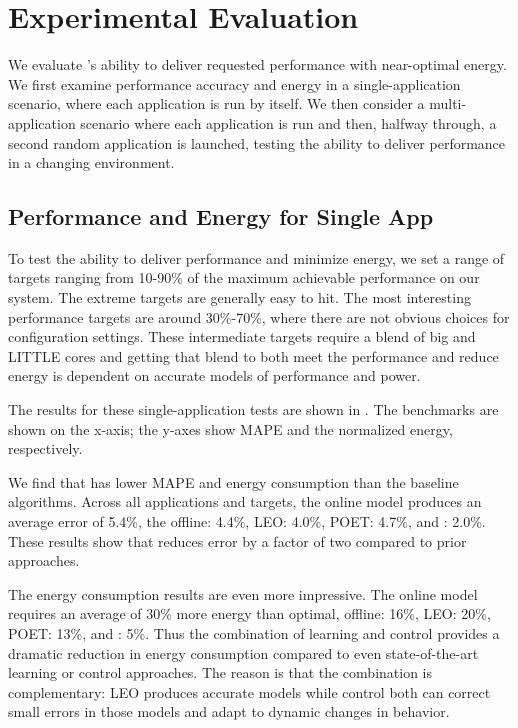\section{Experimental Evaluation}
We evaluate \SYSTEM{}'s ability to deliver requested performance with
near-optimal energy.  We first examine performance accuracy and energy
in a single-application scenario, where each application is run by
itself.  We then consider a multi-application scenario where each
application is run and then, halfway through, a second random
application is launched, testing the ability to deliver performance in
a changing environment.  

\subsection{Performance and Energy for Single App}
To test the ability to deliver performance and minimize energy, we set
a range of targets ranging from 10-90\% of the maximum achievable
performance on our system. The extreme targets are generally easy to
hit. The most interesting performance targets are around 30\%-70\%,
where there are not obvious choices for configuration settings. These
intermediate targets require a blend of big and LITTLE cores and
getting that blend to both meet the performance and reduce energy is
dependent on accurate models of performance and power.

The results for these single-application tests are shown in
.  The benchmarks are shown on the
x-axis; the y-axes show MAPE and the normalized energy, respectively.

We find that \SYSTEM{} has lower MAPE and energy consumption than the
baseline algorithms. Across all applications and targets, the online
model produces an average error of 5.4\%, the offline: 4.4\%, LEO:
4.0\%, POET: 4.7\%, and \SYSTEM{}: 2.0\%.  These results show that
\SYSTEM{} reduces error by a factor of two compared to prior
approaches.  

The energy consumption results are even more impressive.  The online
model requires an average of 30\% more energy than optimal, offline: 16\%, LEO: 20\%, POET: 13\%, and \SYSTEM{}: 5\%.  Thus the combination
of learning and control provides a dramatic reduction in energy
consumption compared to even state-of-the-art learning or control
approaches.  The reason is that the combination is complementary: LEO
produces accurate models while control both can correct small errors
in those models and adapt to dynamic changes in behavior.

